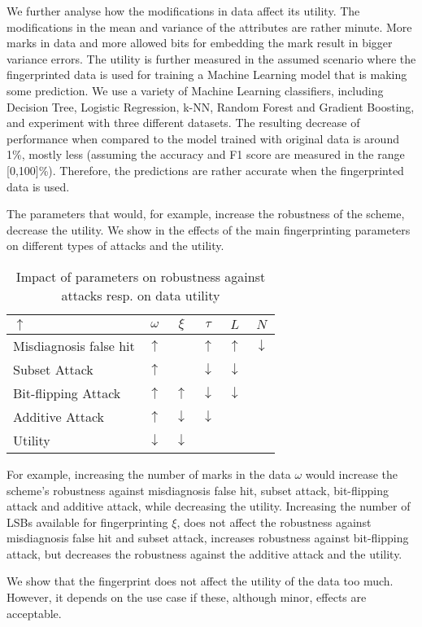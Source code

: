 We further analyse how the modifications in data affect its utility. 
The modifications in the mean and variance of the attributes are rather minute. More marks in data and more allowed bits for embedding the mark result in bigger variance errors.
The utility is further measured in the assumed scenario where the fingerprinted data is used for training a Machine Learning model that is making some prediction.
We use a variety of Machine Learning classifiers, including Decision Tree, Logistic Regression, k-NN, Random Forest and Gradient Boosting, and experiment with three different datasets. 
The resulting decrease of performance when compared to the model trained with original data is around 1\%, mostly less (assuming the accuracy and F1 score are measured in the range [0,100]\%). Therefore, the predictions are rather accurate when the fingerprinted data is used.

The parameters that would, for example, increase the robustness of the scheme, decrease the utility. 
We show in  the effects of the main fingerprinting parameters on different types of attacks and the utility. 

\begin{table}[ht]
    \caption{Impact of parameters on robustness against attacks resp. on data utility}
    \label{tab:parameters}
    \centering
    \setlength{\tabcolsep}{6pt}  %
    \begin{tabular}{|l|c|c|c|c|c|}
        \hline
         $\bm{\uparrow}$ & $\omega$ & $\xi$ &  $\tau$ & $L$ & $N$  \\
         \hline
         Misdiagnosis false hit & $\bm{\uparrow}$ & & $\bm{\uparrow}$ & $\bm{\uparrow}$ & $\bm{\downarrow}$ \\
         \hline
         Subset Attack & $\bm{\uparrow}$ & & $\bm{\downarrow}$ & $\bm{\downarrow}$ & \\
         \hline
         Bit-flipping Attack & $\bm{\uparrow}$ & $\bm{\uparrow}$ & $\bm{\downarrow}$ & $\bm{\downarrow}$ & \\
         \hline
         Additive Attack & $\bm{\uparrow}$ & $\bm{\downarrow}$ & $\bm{\downarrow}$ & & \\
         \hline
         Utility & $\bm{\downarrow}$ & $\bm{\downarrow}$ & & & \\
         \hline
    \end{tabular}
\end{table}

For example, increasing the number of marks in the data $\omega$ would increase the scheme's robustness against misdiagnosis false hit, subset attack, bit-flipping attack and additive attack, while decreasing the utility. 
Increasing the number of LSBs available for fingerprinting $\xi$, does not affect the robustness against misdiagnosis false hit and subset attack, increases robustness against bit-flipping attack, but decreases the robustness against the additive attack and the utility.

We show that the fingerprint does not affect the utility of the data too much. However, it depends on the use case if these, although minor, effects are acceptable. 